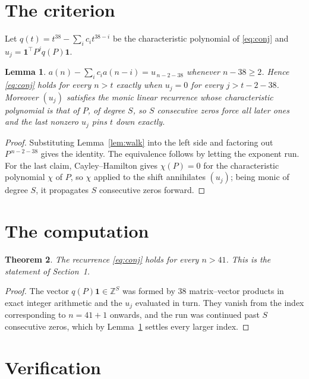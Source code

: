 \documentclass[11pt,a4paper]{article}
\theoremstyle{plain}
\newtheorem{theorem}{Theorem}
\newtheorem{lemma}[theorem]{Lemma}
\theoremstyle{definition}
\begin{document}
\section{The criterion}

Let $q(t)=t^{38}-\sum_i c_i t^{38-i}$ be the characteristic polynomial of
\eqref{eq:conj} and $u_j=\mathbf{1}^{\!\top}P^{j}q(P)\mathbf{1}$.

\begin{lemma}\label{lem:crit}
$a(n)-\sum_i c_i a(n-i)=u_{\,n-2-38}$ whenever $n-38\ge2$. Hence
\eqref{eq:conj} holds for every $n>t$ exactly when $u_j=0$ for every
$j>t-2-38$. Moreover $(u_j)$ satisfies the monic linear recurrence whose
characteristic polynomial is that of $P$, of degree $S$, so $S$ consecutive zeros force all
later ones and the last nonzero $u_j$ pins $t$ down exactly.
\end{lemma}

\begin{proof}
Substituting Lemma~\ref{lem:walk} into the left side and factoring out
$P^{\,n-2-38}$ gives the identity. The equivalence follows by letting the exponent
run. For the last claim, Cayley--Hamilton gives $\chi(P)=0$ for the characteristic
polynomial $\chi$ of $P$, so $\chi$ applied to the shift annihilates $(u_j)$; being monic of
degree $S$, it propagates $S$ consecutive zeros forward.
\end{proof}

\section{The computation}

\begin{theorem}
The recurrence \eqref{eq:conj} holds for every $n>41$. This is the statement of
Section~1.
\end{theorem}

\begin{proof}
The vector $q(P)\mathbf{1}\in\mathbb{Z}^{S}$ was formed by $38$ matrix--vector
products in exact integer arithmetic and the $u_j$ evaluated in turn. They vanish from the
index corresponding to $n=41+1$ onwards, and the run was continued past $S$ consecutive
zeros, which by Lemma~\ref{lem:crit} settles every larger index.
\end{proof}

\section{Verification}
\end{document}

